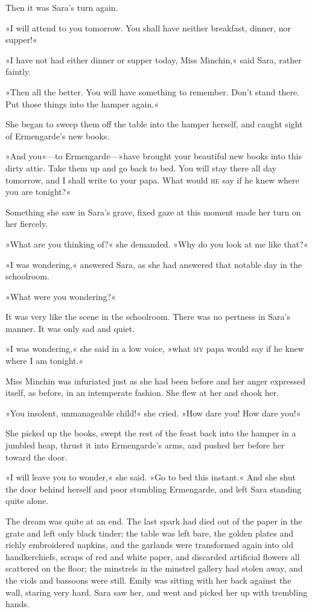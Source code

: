 Then it was Sara's turn again.

»I will attend to you tomorrow. You shall have neither breakfast, dinner, nor supper!«

»I have not had either dinner or supper today, Miss Minchin,« said Sara, rather faintly.

»Then all the better. You will have something to remember. Don't stand there. Put those things into the hamper again.«

She began to sweep them off the table into the hamper herself, and caught sight of Ermengarde's new books.

»And you«—to Ermengarde—»have brought your beautiful new books into this dirty attic. Take them up and go back to bed. You will stay there all day tomorrow, and I shall write to your papa. What would \textsc{he} say if he knew where you are tonight?«

Something she saw in Sara's grave, fixed gaze at this moment made her turn on her fiercely.

»What are you thinking of?« she demanded. »Why do you look at me like that?«

»I was wondering,« answered Sara, as she had answered that notable day in the schoolroom.

»What were you wondering?«

It was very like the scene in the schoolroom. There was no pertness in Sara's manner. It was only sad and quiet.

»I was wondering,« she said in a low voice, »what \textsc{my} papa would say if he knew where I am tonight.«

Miss Minchin was infuriated just as she had been before and her anger expressed itself, as before, in an intemperate fashion. She flew at her and shook her.

»You insolent, unmanageable child!« she cried. »How dare you! How dare you!«

She picked up the books, swept the rest of the feast back into the hamper in a jumbled heap, thrust it into Ermengarde's arms, and pushed her before her toward the door.

»I will leave you to wonder,« she said. »Go to bed this instant.« And she shut the door behind herself and poor stumbling Ermengarde, and left Sara standing quite alone.

The dream was quite at an end. The last spark had died out of the paper in the grate and left only black tinder; the table was left bare, the golden plates and richly embroidered napkins, and the garlands were transformed again into old handkerchiefs, scraps of red and white paper, and discarded artificial flowers all scattered on the floor; the minstrels in the minstrel gallery had stolen away, and the viols and bassoons were still. Emily was sitting with her back against the wall, staring very hard. Sara saw her, and went and picked her up with trembling hands.

